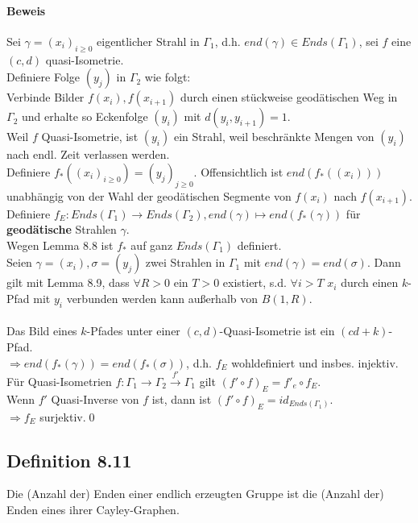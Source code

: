 \documentclass{article}
\begin{document}
\paragraph{Beweis}
Sei $\gamma = (x_i)_{i\geq 0}$ eigentlicher Strahl in $\Gamma_1$, d.h. $end(\gamma) \in Ends(\Gamma_1)$, sei $f$ eine $(c,d)$ quasi-Isometrie.\\
Definiere Folge $(y_j)$ in $\Gamma_2$ wie folgt:\\
Verbinde Bilder $f(x_i), f(x_{i+1})$ durch einen stückweise geodätischen Weg in $\Gamma_2$ und erhalte so Eckenfolge $(y_i)$ mit $d(y_i, y_{i+1}) = 1$.\\
Weil $f$ Quasi-Isometrie, ist $(y_i)$ ein Strahl, weil beschränkte Mengen von $(y_i)$ nach endl. Zeit verlassen werden.\\
Definiere $f_*((x_i)_{i \geq 0}) = (y_j)_{j\geq 0}$. Offensichtlich ist $end(f_*((x_i)))$ unabhängig von der Wahl der geodätischen Segmente von $f(x_i)$ nach $f(x_{i+1})$.\\
Definiere $f_E : Ends(\Gamma_1) \rightarrow Ends(\Gamma_2), end(\gamma) \mapsto end(f_*(\gamma))$ für \textbf{geodätische} Strahlen $\gamma$.\\
Wegen Lemma 8.8 ist $f_*$ auf ganz $Ends(\Gamma_1)$ definiert.\\
Seien $\gamma = (x_i), \sigma = (y_j)$ zwei Strahlen in $\Gamma_1$ mit $end(\gamma) = end(\sigma)$. Dann gilt mit Lemma 8.9, dass $\forall R > 0$ ein $T> 0$ existiert, s.d. $\forall i > T$ $x_i$ durch einen $k$-Pfad mit $y_i$ verbunden werden kann außerhalb von $B(1,R)$.\\\\

Das Bild eines $k$-Pfades unter einer $(c,d)$-Quasi-Isometrie ist ein $(cd+k)$-Pfad.\\
$\Longrightarrow end(f_*(\gamma)) = end(f_*(\sigma))$, d.h. $f_E$ wohldefiniert und insbes. injektiv.\\
Für Quasi-Isometrien $f: \Gamma_1 \rightarrow \Gamma_2 \overset{f'}{\rightarrow} \Gamma_1$ gilt $(f'\circ f)_E = f'_e \circ f_E$.\\
Wenn $f'$ Quasi-Inverse von $f$ ist, dann ist $(f'\circ f)_E = id_{Ends(\Gamma_1)}$.\\
$\Longrightarrow f_E$ surjektiv.\qed


\subsection{Definition 8.11}
Die (Anzahl der) Enden einer endlich erzeugten Gruppe ist die (Anzahl der) Enden eines ihrer Cayley-Graphen.
\end{document}

